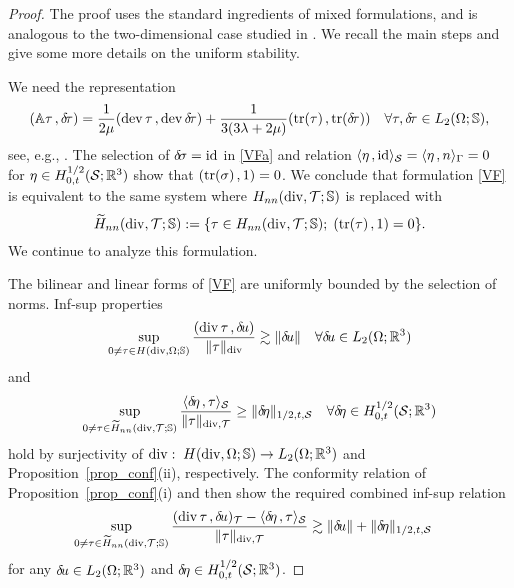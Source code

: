 \documentclass[11pt]{article}
\begin{document}
\begin{proof}
The proof uses the standard ingredients of mixed formulations, and is
analogous to the two-dimensional case studied in \cite[Theorem~10]{CarstensenH_NNC}.
We recall the main steps and give some more details on the uniform stability.

We need the representation
\begin{align} \label{coercive}
   (\mathbb{A}\tau\hspace*{.5mm},{\delta\!\tau})
   =
   \frac 1{2\mu} (\operatorname{dev}\tau\hspace*{.5mm},\operatorname{dev}{\delta\!\tau})
   +
   \frac 1{3(3\lambda+2\mu)} (\operatorname{tr}(\tau)\hspace*{.5mm},\operatorname{tr}({\delta\!\tau}))
   \quad\forall \tau,{\delta\!\tau}\in L_2(\Omega;\mathbb{S}),
\end{align}
see, e.g., \cite[(9.1.8)]{BoffiBF_13_MFE}.
The selection of ${\delta\!\sigma}=\operatorname{\mathrm{id}}$ in \eqref{VFa} and relation
$\langle{}\eta\hspace*{.5mm},\operatorname{\mathrm{id}}\rangle_{\mathcal{S}}=\langle{}\eta\hspace*{.5mm},n\rangle_\Gamma=0$ for $\eta\in H^{1/2}_{0,t}(\mathcal{S};\mathbb{R}^3)$
show that $(\operatorname{tr}(\sigma)\hspace*{.5mm},1)=0$. We conclude that formulation \eqref{VF}
is equivalent to the same system where $H_{nn}(\operatorname{div},\mathcal{T};\mathbb{S})$ is replaced with
\[
   \widetilde H_{nn}(\operatorname{div},\mathcal{T};\mathbb{S}) := \{
   \tau\in H_{nn}(\operatorname{div},\mathcal{T};\mathbb{S});\; (\operatorname{tr}(\tau)\hspace*{.5mm},1)=0\}.
\]
We continue to analyze this formulation.

The bilinear and linear forms of \eqref{VF} are uniformly bounded by the selection
of norms. Inf-sup properties
\begin{align*} %
   \sup_{0\not=\tau\in H(\div,\Omega;\SS)}
   \frac {\vdual{\div\tau}{\du}}{\|\tau\|_{\div}}
   \gtrsim
   \|\du\|\quad\forall\du\in L_2(\Omega;\Rt)
\end{align*}
and
\begin{align*} %
   \sup_{0\not=\tau\in \wtilde H_{nn}(\div,\mesh;\SS)}
   \frac {\dual{\deta}{\tau}_\cS}{\|\tau\|_{\div,\mesh}}
   \ge
   \|\deta\|_{1/2,t,\cS}\quad\forall\deta\in H^{1/2}_{0,t}(\cS;\Rt)
\end{align*}
hold by surjectivity of $\operatorname{div}:\;H(\operatorname{div},\Omega;\mathbb{S})\to L_2(\Omega;\mathbb{R}^3)$
and Proposition~\ref{prop_conf}(ii), respectively.
The conformity relation of Proposition~\ref{prop_conf}(i)
and \cite[Theorem~3.3]{CarstensenDG_16_BSF} then show the required combined inf-sup relation
\begin{align*}  %
   \sup_{0\not=\tau\in \wtilde H_{nn}(\div,\mesh;\SS)}
   \frac {\vdual{\div\tau}{\du}_\mesh -\dual{\deta}{\tau}_\cS}{\|\tau\|_{\div,\mesh}}
   \gtrsim
   \|\du\| + \|\deta\|_{1/2,t,\cS}\quad
\end{align*}
for any ${\delta\!u}\in L_2(\Omega;\mathbb{R}^3)$ and ${\delta\!\eta}\in H^{1/2}_{0,t}(\mathcal{S};\mathbb{R}^3)$.


\end{proof}
\end{document}

